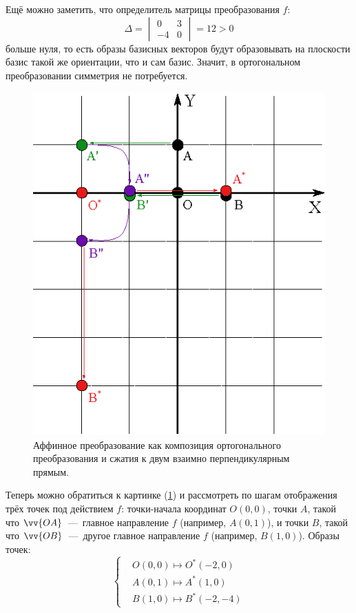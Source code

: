 \documentclass[a4paper,12pt]{article}
\begin{document}
\begin{solution}
    Ещё можно заметить, что определитель матрицы преобразования $f$:
    \[
      \Delta = \begin{vmatrix} 0 & 3\\ -4 & 0\end{vmatrix} = 12 > 0
    \]
    больше нуля, то есть образы базисных векторов будут образовывать на плоскости базис такой же ориентации, что и сам базис.
    Значит, в ортогональном преобразовании симметрия не потребуется.
    
    \begin{figure}
      \centering
      
      \includegraphics[width=0.5\columnwidth]{affine-as-composition}
      
      \caption{Аффинное преобразование как композиция ортогонального преобразования и сжатия к двум взаимно перпендикулярным прямым.}
      \label{fig:affine-as-composition}
    \end{figure}
    
    Теперь можно обратиться к картинке (\ref{fig:affine-as-composition}) и рассмотреть по шагам отображения трёх точек под действием $f$: точки-начала координат $O(0, 0)$, точки $A$, такой что $\vv{OA}$~---~главное направление $f$ (например, $A(0, 1)$), и точки $B$, такой что $\vv{OB}$~---~другое главное направление $f$ (например, $B(1, 0)$).
    Образы точек:
    \[
      \left\{
        \begin{aligned}
          &O(0, 0) \mapsto O^*(-2, 0)\\
          &A(0, 1) \mapsto A^*(1, 0)\\
          &B(1, 0) \mapsto B^*(-2, -4)
        \end{aligned}
      \right.
    \]
    

\end{solution}
\end{document}
